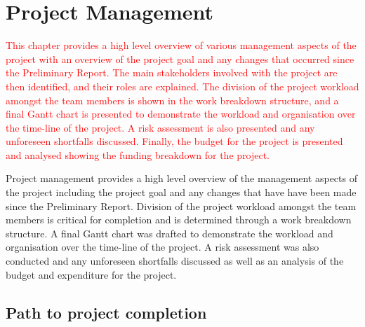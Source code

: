 \documentclass[main.tex]{subfiles}
\begin{document}
\chapter{Project Management}
\textcolor{red}{This chapter provides a high level overview of various management aspects of the project with an overview of the project goal and  any changes that occurred since the Preliminary Report. The main stakeholders involved with the project are then identified, and their roles are explained. The division of the project workload amongst the team members is shown in the work breakdown structure, and a final Gantt chart is presented to demonstrate the workload and organisation over the time-line of the project. A risk assessment is also presented and any unforeseen shortfalls discussed. Finally, the budget for the project is presented and analysed showing the funding breakdown for the project.}

Project management provides a high level overview of the management aspects of the project including the project goal and any changes that have have been made since the Preliminary Report. Division of the project workload amongst the team members is critical for completion and is determined through a work breakdown structure. A final Gantt chart was drafted to demonstrate the workload and organisation over the time-line of the project. A risk assessment was also conducted and any unforeseen shortfalls discussed as well as an analysis of the budget and expenditure for the project.

\section{Path to project completion}
\end{document}
